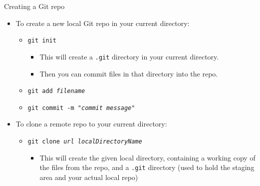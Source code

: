 \documentclass[aspectratio=169,11pt,t]{beamer}
\newcommand{\hl}[1]{\textcolor{accent}{#1}}              %
\newcommand{\cmd}[1]{\textcolor{cmdcol}{\texttt{#1}}}    %
\newcommand{\ph}[1]{\textit{#1}}                         %
\begin{document}
\begin{frame}{Creating a Git repo}
  \small
  \begin{itemize}
    \item To create a new \hl{local Git repo} in your current directory:
      \begin{itemize}
        \item \cmd{git init}
          \begin{itemize}
            \item This will create a \texttt{.git} directory in your current directory.
            \item Then you can commit files in that directory into the repo.
          \end{itemize}
        \item \cmd{git add \ph{filename}}
        \item \cmd{git commit -m "\ph{commit message}"}
      \end{itemize}
    \vskip2mm
    \item To \hl{clone a remote repo} to your current directory:
      \begin{itemize}
        \item \cmd{git clone \ph{url localDirectoryName}}
          \begin{itemize}
            \item This will create the given local directory, containing a working copy of the
                  files from the repo, and a \texttt{.git} directory (used to hold the staging
                  area and your actual local repo)
          \end{itemize}
      \end{itemize}
  \end{itemize}
\end{frame}
\end{document}
